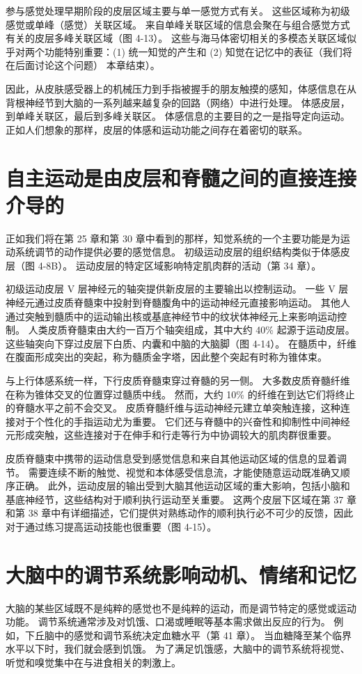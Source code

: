 参与感觉处理早期阶段的皮层区域主要与单一感觉方式有关。 这些区域称为初级感觉或单峰（感觉）关联区域。 来自单峰关联区域的信息会聚在与组合感觉方式有关的皮层多峰关联区域（图 4-13）。 这些与海马体密切相关的多模态关联区域似乎对两个功能特别重要：(1) 统一知觉的产生和 (2) 知觉在记忆中的表征（我们将在后面讨论这个问题） 本章结束）。

因此，从皮肤感受器上的机械压力到手指被握手的朋友触摸的感知，体感信息在从背根神经节到大脑的一系列越来越复杂的回路（网络）中进行处理。 体感皮层，到单峰关联区，最后到多峰关联区。 体感信息的主要目的之一是指导定向运动。 正如人们想象的那样，皮层的体感和运动功能之间存在着密切的联系。

\section{自主运动是由皮层和脊髓之间的直接连接介导的}

正如我们将在第 25 章和第 30 章中看到的那样，知觉系统的一个主要功能是为运动系统调节的动作提供必要的感觉信息。 初级运动皮层的组织结构类似于体感皮层（图 4-8B）。 运动皮层的特定区域影响特定肌肉群的活动（第 34 章）。

初级运动皮层 V 层神经元的轴突提供新皮层的主要输出以控制运动。 一些 V 层神经元通过皮质脊髓束中投射到脊髓腹角中的运动神经元直接影响运动。 其他人通过突触到髓质中的运动输出核或基底神经节中的纹状体神经元上来影响运动控制。 人类皮质脊髓束由大约一百万个轴突组成，其中大约 40\% 起源于运动皮层。 这些轴突向下穿过皮层下白质、内囊和中脑的大脑脚（图 4-14）。 在髓质中，纤维在腹面形成突出的突起，称为髓质金字塔，因此整个突起有时称为锥体束。

与上行体感系统一样，下行皮质脊髓束穿过脊髓的另一侧。 大多数皮质脊髓纤维在称为锥体交叉的位置穿过髓质中线。 然而，大约 10\% 的纤维在到达它们将终止的脊髓水平之前不会交叉。 皮质脊髓纤维与运动神经元建立单突触连接，这种连接对于个性化的手指运动尤为重要。 它们还与脊髓中的兴奋性和抑制性中间神经元形成突触，这些连接对于在伸手和行走等行为中协调较大的肌肉群很重要。

皮质脊髓束中携带的运动信息受到感觉信息和来自其他运动区域的信息的显着调节。 需要连续不断的触觉、视觉和本体感受信息流，才能使随意运动既准确又顺序正确。 此外，运动皮层的输出受到大脑其他运动区域的重大影响，包括小脑和基底神经节，这些结构对于顺利执行运动至关重要。 这两个皮层下区域在第 37 章和第 38 章中有详细描述，它们提供对熟练动作的顺利执行必不可少的反馈，因此对于通过练习提高运动技能也很重要（图 4-15）。

\section{大脑中的调节系统影响动机、情绪和记忆}
大脑的某些区域既不是纯粹的感觉也不是纯粹的运动，而是调节特定的感觉或运动功能。 调节系统通常涉及对饥饿、口渴或睡眠等基本需求做出反应的行为。 例如，下丘脑中的感觉和调节系统决定血糖水平（第 41 章）。 当血糖降至某个临界水平以下时，我们就会感到饥饿。 为了满足饥饿感，大脑中的调节系统将视觉、听觉和嗅觉集中在与进食相关的刺激上。

